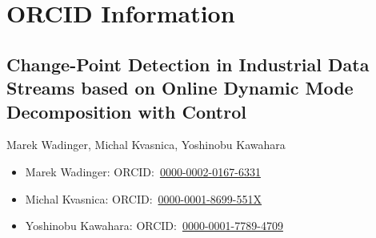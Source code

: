 \documentclass{article}
\begin{document}
\section*{ORCID Information}

\subsection*{Change-Point Detection in Industrial Data Streams based on Online Dynamic Mode Decomposition with Control}
Marek Wadinger, Michal Kvasnica, Yoshinobu Kawahara
\vspace{1em}

\begin{itemize}
    \item Marek Wadinger: ORCID:~\href{https://orcid.org/0000-0002-0167-6331}{0000-0002-0167-6331}
    \item Michal Kvasnica: ORCID:~\href{https://orcid.org/0000-0001-8699-551X}{0000-0001-8699-551X}
    \item Yoshinobu Kawahara: ORCID:~\href{https://orcid.org/0000-0001-7789-4709}{0000-0001-7789-4709}
\end{itemize}
\end{document}
